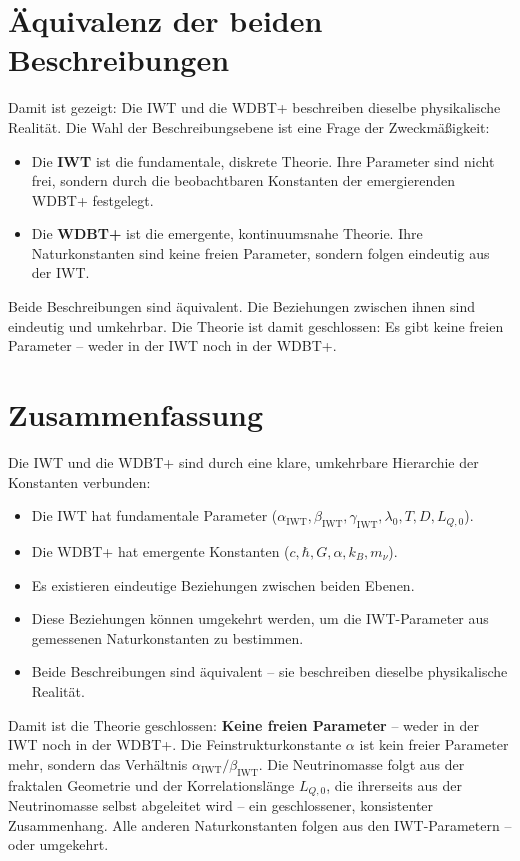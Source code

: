 \section{Äquivalenz der beiden Beschreibungen}
\label{sec:aequivalenz}

Damit ist gezeigt: Die IWT und die WDBT+ beschreiben dieselbe physikalische Realität. Die Wahl der Beschreibungsebene ist eine Frage der Zweckmäßigkeit:

\begin{itemize}
    \item Die \textbf{IWT} ist die fundamentale, diskrete Theorie. Ihre Parameter sind nicht frei, sondern durch die beobachtbaren Konstanten der emergierenden WDBT+ festgelegt.
    \item Die \textbf{WDBT+} ist die emergente, kontinuumsnahe Theorie. Ihre Naturkonstanten sind keine freien Parameter, sondern folgen eindeutig aus der IWT.
\end{itemize}

Beide Beschreibungen sind äquivalent. Die Beziehungen zwischen ihnen sind eindeutig und umkehrbar. Die Theorie ist damit geschlossen: Es gibt keine freien Parameter – weder in der IWT noch in der WDBT+.

\section{Zusammenfassung}
\label{sec:naturkonstanten_zusammenfassung}

Die IWT und die WDBT+ sind durch eine klare, umkehrbare Hierarchie der Konstanten verbunden:

\begin{itemize}
    \item Die IWT hat fundamentale Parameter (\( \alpha_{\text{IWT}}, \beta_{\text{IWT}}, \gamma_{\text{IWT}}, \lambda_0, T, D, L_{Q,0} \)).
    \item Die WDBT+ hat emergente Konstanten (\( c, \hbar, G, \alpha, k_B, m_\nu \)).
    \item Es existieren eindeutige Beziehungen zwischen beiden Ebenen.
    \item Diese Beziehungen können umgekehrt werden, um die IWT-Parameter aus gemessenen Naturkonstanten zu bestimmen.
    \item Beide Beschreibungen sind äquivalent – sie beschreiben dieselbe physikalische Realität.
\end{itemize}

Damit ist die Theorie geschlossen: \textbf{Keine freien Parameter} – weder in der IWT noch in der WDBT+. Die Feinstrukturkonstante \( \alpha \) ist kein freier Parameter mehr, sondern das Verhältnis \( \alpha_{\text{IWT}} / \beta_{\text{IWT}} \). Die Neutrinomasse folgt aus der fraktalen Geometrie und der Korrelationslänge \( L_{Q,0} \), die ihrerseits aus der Neutrinomasse selbst abgeleitet wird – ein geschlossener, konsistenter Zusammenhang. Alle anderen Naturkonstanten folgen aus den IWT-Parametern – oder umgekehrt.

